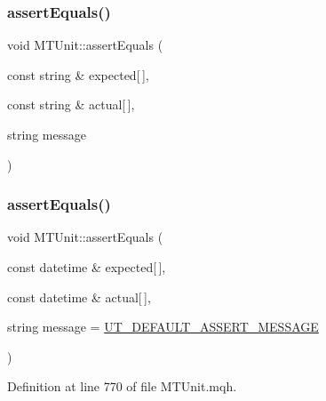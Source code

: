 \subsubsection{\texorpdfstring{assert\+Equals()}{assertEquals()}\hspace{0.1cm}{\footnotesize\ttfamily [26/28]}}
{\footnotesize\ttfamily void M\+T\+Unit\+::assert\+Equals (\begin{DoxyParamCaption}\item[{const string \&}]{expected\mbox{[}$\,$\mbox{]},  }\item[{const string \&}]{actual\mbox{[}$\,$\mbox{]},  }\item[{string}]{message }\end{DoxyParamCaption})}

\mbox{\label{class_m_t_unit_a7282c4d267a78b1270c99a52cf344cad}} 
\subsubsection{\texorpdfstring{assert\+Equals()}{assertEquals()}\hspace{0.1cm}{\footnotesize\ttfamily [27/28]}}
{\footnotesize\ttfamily void M\+T\+Unit\+::assert\+Equals (\begin{DoxyParamCaption}\item[{const datetime \&}]{expected\mbox{[}$\,$\mbox{]},  }\item[{const datetime \&}]{actual\mbox{[}$\,$\mbox{]},  }\item[{string}]{message = {\ttfamily \mbox{\hyperlink{_m_t_unit_8mqh_a96f5d62188d09039ebc3f443c9120e39}{U\+T\+\_\+\+D\+E\+F\+A\+U\+L\+T\+\_\+\+A\+S\+S\+E\+R\+T\+\_\+\+M\+E\+S\+S\+A\+GE}}} }\end{DoxyParamCaption})}



Definition at line 770 of file M\+T\+Unit.\+mqh.

\mbox{\label{class_m_t_unit_ac757c452569aa85927b56dee69a97ea0}} 

